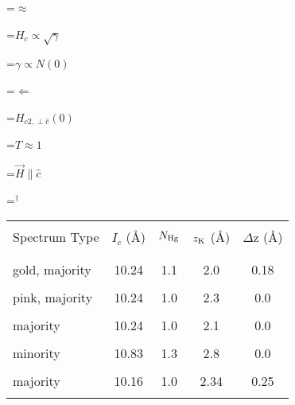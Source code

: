 {\newpage
\clearpage
\samepage \setbox\sizebox=\hbox{$\approx$}\box\sizebox
}

{\newpage
\clearpage
\samepage \setbox\sizebox=\hbox{$H_c \propto  \sqrt{\gamma}$}\box\sizebox
}

{\newpage
\clearpage
\samepage \setbox\sizebox=\hbox{$ \gamma \propto  N(0)$}\box\sizebox
}

{\newpage
\clearpage
\samepage \setbox\sizebox=\hbox{$\Longleftarrow$}\box\sizebox
}

{\newpage
\clearpage
\samepage \setbox\sizebox=\hbox{$H_{c2,  \perp
\hat{c}}(0)$}\box\sizebox
}

{\newpage
\clearpage
\samepage \setbox\sizebox=\hbox{$T  \approx 1$}\box\sizebox
}

{\newpage
\clearpage
\samepage \setbox\sizebox=\hbox{$ \vec{H}
\parallel  \hat{c}$}\box\sizebox
}

{\newpage
\clearpage
\samepage \setbox\sizebox=\hbox{$^{\dagger}$}\box\sizebox
}

{\newpage
\clearpage
\samepage \begin{table}\begin{center}
\begin{tabular}{|l|cccc|}
\hline
&  & & &  \\  Spectrum Type  & $I_c$ (\AA) & $N_{\rm Hg}$  & $z_{\rm K}$  (\AA)  &
$\Delta$z (\AA) \\  & & & & \\ 
\hline
& & & & \\  gold, majority & 10.24 & 1.1  & 2.0 & 0.18  \\  & &  & & \\  pink,
majority  &    10.24    & 1.0 &   2.3     &  0.0    \\   &    &    &   &  \\ 
majority\cite{yang84,kamitakahara84b} & 10.24 & 1.0 & 2.1 & 0.0 \\  & &  & &
\\  minority\cite{yang84,kamitakahara84b} & 10.83 & 1.3 & 2.8 & 0.0 \\  & & &
& \\  majority\cite{elmakrini80} & 10.16 & 1.0 & 2.34 & 0.25 \\  & & & & \\ 
\hline
\end{tabular}
\end{center}

\label{neutnum}
\end{table}
}

